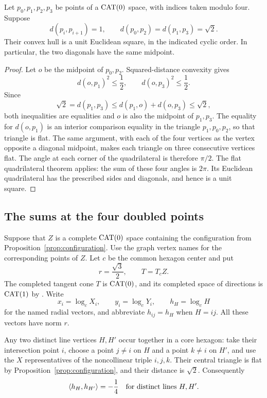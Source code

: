 \begin{lemma}
\label{geom:square}
Let $p_0,p_1,p_2,p_3$ be points of a $\operatorname{CAT}(0)$ space, with indices
taken modulo four.  Suppose
\[
 d(p_i,p_{i+1})=1,\qquad
 d(p_0,p_2)=d(p_1,p_3)=\sqrt{2}.
\]
Their convex hull is a unit Euclidean square, in the indicated cyclic
order.  In particular, the two diagonals have the same midpoint.
\end{lemma}

\begin{proof}
Let $o$ be the midpoint of $p_0,p_2$.  Squared-distance convexity gives
\[
 d(o,p_1)^2\leq\frac12,\qquad d(o,p_3)^2\leq\frac12.
\]
Since
\[
 \sqrt2=d(p_1,p_3)\leq d(p_1,o)+d(o,p_3)\leq\sqrt2,
\]
both inequalities are equalities and $o$ is also the midpoint of
$p_1,p_3$.  The equality for $d(o,p_1)$ is an interior comparison
equality in the triangle $p_1,p_0,p_2$, so that triangle is flat.  The
same argument, with each of the four vertices as the vertex opposite
a diagonal midpoint, makes each triangle on three consecutive vertices
flat.  The angle at each corner of the quadrilateral is therefore
$\pi/2$.  The flat quadrilateral theorem
\cite[Theorem~II.2.11]{BH1999} applies: the sum of these four angles is
$2\pi$.  Its Euclidean quadrilateral has the prescribed sides and
diagonals, and hence is a unit square.
\end{proof}

\subsection{The sums at the four doubled points}

Suppose that $Z$ is a complete $\operatorname{CAT}(0)$ space containing the
configuration from Proposition~\ref{prop:configuration}.  Use the graph
vertex names for the corresponding points of $Z$.  Let $c$ be the common
hexagon center and put
\[
 r=\frac{\sqrt3}{2},\qquad T=T_c Z.
\]
The completed tangent cone $T$ is $\operatorname{CAT}(0)$, and its completed space of
directions is $\operatorname{CAT}(1)$ by \cite[Theorem~II.3.19]{BH1999}.  Write
\[
 x_i=\log_c X_i,\qquad y_i=\log_c Y_i,\qquad
 h_H=\log_c H
\]
for the named radial vectors, and abbreviate $h_{ij}=h_H$ when
$H=ij$.  All these vectors have norm $r$.

Any two distinct line vertices $H,H'$ occur together in a core
hexagon: take their intersection point $i$, choose a point $j\ne i$
on $H$ and a point $k\ne i$ on $H'$, and use the $X$ representatives
of the noncollinear triple $i,j,k$.  Their central triangle is flat
by Proposition~\ref{prop:configuration}, and their distance is
$\sqrt2$.  Consequently
\begin{equation}
 \langle h_H,h_{H'}\rangle=-\frac14
 \quad\text{for distinct lines }H,H'.
 \label{geom:line-products}
\end{equation}

